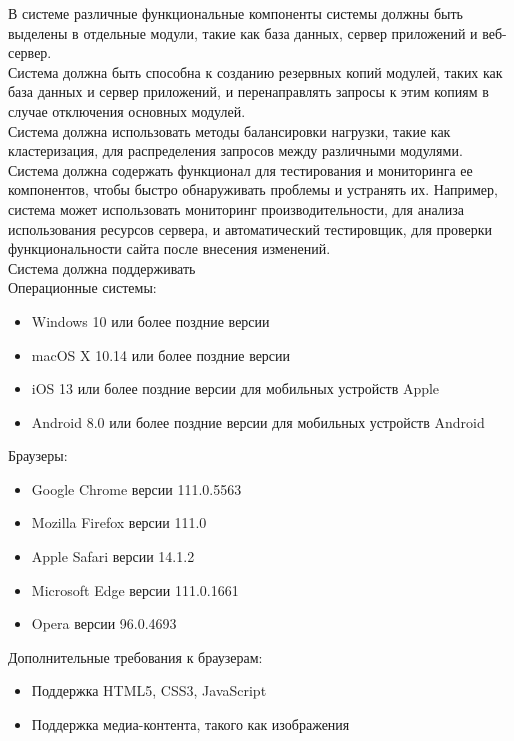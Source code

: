 \begin{enumerate}
\begin{enumerate}[label=2.\arabic*]
        В системе различные функциональные компоненты системы должны быть выделены в отдельные модули, такие как база
        данных, сервер приложений и веб-сервер. \\
        Система должна быть способна к созданию резервных копий модулей, таких как база данных и сервер приложений, и
        перенаправлять запросы к этим копиям в случае отключения основных модулей. \\
        Система должна использовать методы балансировки нагрузки, такие как кластеризация, для распределения запросов
        между различными модулями. \\
        Система должна содержать функционал для тестирования и мониторинга ее компонентов, чтобы быстро обнаруживать
        проблемы и устранять их. Например, система может использовать мониторинг производительности, для анализа
        использования ресурсов сервера, и автоматический тестировщик, для проверки функциональности сайта после внесения изменений. \\
        Система должна поддерживать \\
        \quad Операционные системы:
        \begin{itemize}
            \item Windows 10 или более поздние версии
            \item macOS X 10.14 или более поздние версии
            \item iOS 13 или более поздние версии для мобильных устройств Apple
            \item Android 8.0 или более поздние версии для мобильных устройств Android
        \end{itemize}
        \quad Браузеры:
        \begin{itemize}
            \item Google Chrome версии 111.0.5563
            \item Mozilla Firefox версии 111.0
            \item Apple Safari версии 14.1.2
            \item Microsoft Edge версии 111.0.1661
            \item Opera версии 96.0.4693
        \end{itemize}
        \quad Дополнительные требования к браузерам:
        \begin{itemize}
            \item Поддержка HTML5, CSS3, JavaScript
            \item Поддержка медиа-контента, такого как изображения

\end{itemize}
\end{enumerate}
\end{enumerate}
